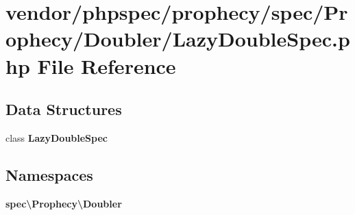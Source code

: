 \section{vendor/phpspec/prophecy/spec/\+Prophecy/\+Doubler/\+Lazy\+Double\+Spec.php File Reference}
\label{_lazy_double_spec_8php}
\subsection*{Data Structures}
\begin{DoxyCompactItemize}
\item 
class {\bf Lazy\+Double\+Spec}
\end{DoxyCompactItemize}
\subsection*{Namespaces}
\begin{DoxyCompactItemize}
\item 
 {\bf spec\textbackslash{}\+Prophecy\textbackslash{}\+Doubler}
\end{DoxyCompactItemize}
